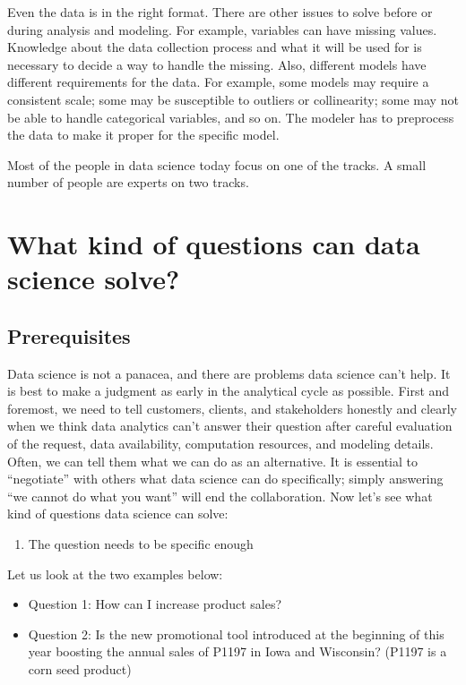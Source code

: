 \documentclass[
  12pt,
]{krantz}
\providecommand{\tightlist}{%
  \setlength{\itemsep}{0pt}\setlength{\parskip}{0pt}}
\begin{document}
Even the data is in the right format. There are other issues to solve before or during analysis and modeling. For example, variables can have missing values. Knowledge about the data collection process and what it will be used for is necessary to decide a way to handle the missing. Also, different models have different requirements for the data. For example, some models may require a consistent scale; some may be susceptible to outliers or collinearity; some may not be able to handle categorical variables, and so on. The modeler has to preprocess the data to make it proper for the specific model.

Most of the people in data science today focus on one of the tracks. A small number of people are experts on two tracks.

\hypertarget{what-kind-of-questions-can-data-science-solve}{%
\section{What kind of questions can data science solve?}\label{what-kind-of-questions-can-data-science-solve}}

\hypertarget{prerequisites}{%
\subsection{Prerequisites}\label{prerequisites}}

Data science is not a panacea, and there are problems data science can't help. It is best to make a judgment as early in the analytical cycle as possible. First and foremost, we need to tell customers, clients, and stakeholders honestly and clearly when we think data analytics can't answer their question after careful evaluation of the request, data availability, computation resources, and modeling details. Often, we can tell them what we can do as an alternative. It is essential to ``negotiate'' with others what data science can do specifically; simply answering ``we cannot do what you want'' will end the collaboration. Now let's see what kind of questions data science can solve:

\begin{enumerate}
\def\labelenumi{\arabic{enumi}.}
\tightlist
\item
  The question needs to be specific enough
\end{enumerate}

Let us look at the two examples below:

\begin{itemize}
\tightlist
\item
  Question 1: How can I increase product sales?
\item
  Question 2: Is the new promotional tool introduced at the beginning of this year boosting the annual sales of P1197 in Iowa and Wisconsin? (P1197 is a corn seed product)
\end{itemize}
\end{document}
